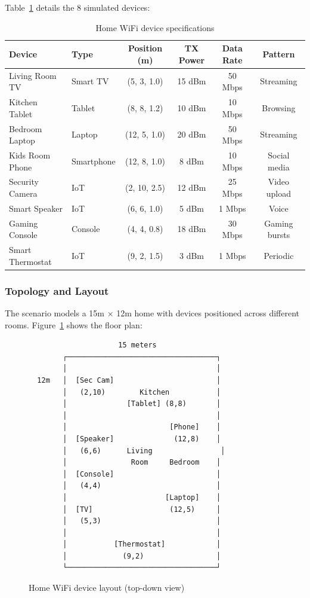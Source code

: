Table~\ref{tab:home-wifi-devices} details the 8 simulated devices:

\begin{table}[htbp]
\centering
\caption{Home WiFi device specifications}
\label{tab:home-wifi-devices}
\small
\begin{tabular}{@{}llcccc@{}}
\toprule
\textbf{Device} & \textbf{Type} & \textbf{Position (m)} & \textbf{TX Power} & \textbf{Data Rate} & \textbf{Pattern} \\
\midrule
Living Room TV & Smart TV & (5, 3, 1.0) & 15 dBm & 50 Mbps & Streaming \\
Kitchen Tablet & Tablet & (8, 8, 1.2) & 10 dBm & 10 Mbps & Browsing \\
Bedroom Laptop & Laptop & (12, 5, 1.0) & 20 dBm & 50 Mbps & Streaming \\
Kids Room Phone & Smartphone & (12, 8, 1.0) & 8 dBm & 10 Mbps & Social media \\
Security Camera & IoT & (2, 10, 2.5) & 12 dBm & 25 Mbps & Video upload \\
Smart Speaker & IoT & (6, 6, 1.0) & 5 dBm & 1 Mbps & Voice \\
Gaming Console & Console & (4, 4, 0.8) & 18 dBm & 30 Mbps & Gaming bursts \\
Smart Thermostat & IoT & (9, 2, 1.5) & 3 dBm & 1 Mbps & Periodic \\
\bottomrule
\end{tabular}
\end{table}

\subsubsection{Topology and Layout}

The scenario models a 15m × 12m home with devices positioned across different rooms. Figure~\ref{fig:home-layout} shows the floor plan:

\begin{figure}[htbp]
\centering
\begin{verbatim}
                     15 meters
        ┌───────────────────────────────────┐
        │                                   │
  12m   │  [Sec Cam]                        │
        │   (2,10)        Kitchen           │
        │              [Tablet] (8,8)       │
        │                                   │
        │                        [Phone]    │
        │  [Speaker]              (12,8)    │
        │   (6,6)      Living                │
        │               Room     Bedroom    │
        │  [Console]                        │
        │   (4,4)                           │
        │                       [Laptop]    │
        │  [TV]                  (12,5)     │
        │   (5,3)                           │
        │                                   │
        │           [Thermostat]            │
        │             (9,2)                 │
        └───────────────────────────────────┘
\end{verbatim}
\caption{Home WiFi device layout (top-down view)}
\label{fig:home-layout}
\end{figure}


